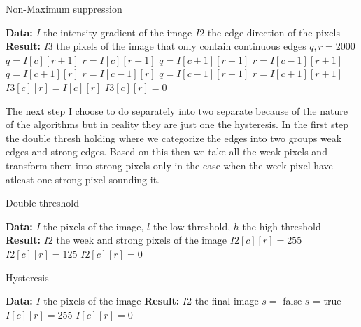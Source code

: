 \begin{algorithm}[H]
\caption{Non-Maximum suppression}
\label{alg:max}
\begin{algorithmic}
\State \textbf{Data:} $I$ the intensity gradient of the image $I2$ the edge direction of the pixels 
\State \textbf{Result:} $I3$ the pixels of the image that only contain continuous edges
\State $q,r = 2000$
\State $q = I[c][r + 1]$
\State $r = I[c][r - 1]$
\State $q = I[c + 1][r - 1]$
\State $r = I[c - 1][r + 1]$
\State $q = I[c + 1][r]$
\State $r = I[c - 1][r]$
\State $q = I[c - 1][r - 1]$
\State $r = I[c + 1][r + 1]$
\EndIf
{}
\State $I3[c][r] = I[c][r]$
\Else
\State $I3[c][r] = 0$
\EndIf
\EndFor
\end{algorithmic}
\end{algorithm}

The next step I choose to do separately into two separate because of the nature of the  algorithms but in reality they are just one the hysteresis. In the first step the double thresh holding where we categorize the edges into two groups weak edges and strong edges. Based on this then we take all the weak pixels and transform them into strong pixels only in the case when the week pixel have atleast one strong pixel sounding it.

\begin{algorithm}[H]
\caption{Double threshold}
\label{alg:thresh}
\begin{algorithmic}
\State \textbf{Data:} $I$ the pixels of the image, $l$ the low threshold, $h$ the high threshold
\State \textbf{Result:} $I2$ the week and strong pixels of the image
\State $I2[c][r] = 255$
\State $I2[c][r] = 125$
\Else
\State $I2[c][r] = 0$
\EndIf
\EndFor
\end{algorithmic}
\end{algorithm}

\begin{algorithm}[H]
\caption{Hysteresis}
\label{alg:hys}
\begin{algorithmic}
\State \textbf{Data:} $I$ the pixels of the image
\State \textbf{Result:} $I2$ the final image
\State $s =$ false
\State $s$ = true
\EndIf
\EndFor
\EndFor
{}
\State $I[c][r] = 255$
\Else
\State $I[c][r] = 0$
\EndIf
\EndFor
\end{algorithmic}
\end{algorithm}

